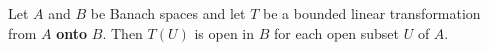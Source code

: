 Let $A$ and $B$ be Banach spaces and let $T$ be a bounded linear transformation from $A$ \textbf{onto} $B$. Then $T(U)$ is open in $B$ for each open subset $U$ of $A$.
